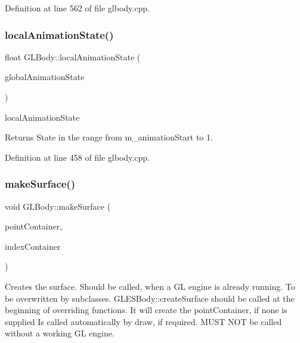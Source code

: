 Definition at line 562 of file glbody.\+cpp.

\mbox{\label{class_g_l_body_a30ff6f538a3966b06b2f07739070d14d}} 
\subsubsection{\texorpdfstring{localAnimationState()}{localAnimationState()}}
{\footnotesize\ttfamily float G\+L\+Body\+::local\+Animation\+State (\begin{DoxyParamCaption}\item[{float}]{global\+Animation\+State }\end{DoxyParamCaption})}



local\+Animation\+State 

\begin{DoxyReturn}{Returns}
State in the range from m\+\_\+animation\+Start to 1. 
\end{DoxyReturn}


Definition at line 458 of file glbody.\+cpp.

\mbox{\label{class_g_l_body_a73e51b159f343d0bda87f50df382b7db}} 
\subsubsection{\texorpdfstring{makeSurface()}{makeSurface()}}
{\footnotesize\ttfamily void G\+L\+Body\+::make\+Surface (\begin{DoxyParamCaption}\item[{Q\+Vector$<$ \mbox{\hyperlink{class_g_l_point}{G\+L\+Point}} $>$ $\ast$}]{point\+Container,  }\item[{Q\+Vector$<$ \mbox{\hyperlink{gldefines_8h_af3c748960f29c42e5b7f1dc449ab66ff}{Index\+Type}} $>$ $\ast$}]{index\+Container }\end{DoxyParamCaption})\hspace{0.3cm}{\ttfamily [virtual]}}

Creates the surface. Should be called, when a GL engine is already running. To be overwritten by subclasses. G\+L\+E\+S\+Body\+::create\+Surface should be called at the beginning of overriding functions. It will create the point\+Container, if none is supplied Is called automatically by draw, if required. M\+U\+ST N\+OT be called without a working GL engine.


